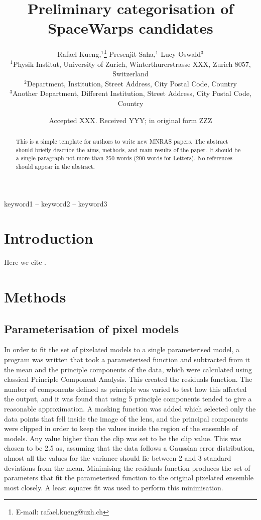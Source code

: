 \documentclass[fleqn,usenatbib]{mnras}
\title[Short title, max. 45 characters]{Preliminary categorisation of SpaceWarps candidates}
\author[R. Kueng et al.]{
Rafael Kueng,$^{1}$\thanks{E-mail: rafael.kueng@uzh.ch}
Presenjit Saha,$^{1}$
Lucy Oswald$^{3}$
\\
$^{1}$Physik Institut, University of Zurich, Winterthurerstrasse XXX, Zurich 8057, Switzerland\\
$^{2}$Department, Institution, Street Address, City Postal Code, Country\\
$^{3}$Another Department, Different Institution, Street Address, City Postal Code, Country
}
\date{Accepted XXX. Received YYY; in original form ZZZ}
\begin{document}
\label{firstpage}
\pagerange{\pageref{firstpage}--\pageref{lastpage}}
\maketitle

\begin{abstract}
This is a simple template for authors to write new MNRAS papers.
The abstract should briefly describe the aims, methods, and main results of the paper.
It should be a single paragraph not more than 250 words (200 words for Letters).
No references should appear in the abstract.
\end{abstract}

\begin{keywords}
keyword1 -- keyword2 -- keyword3
\end{keywords}


\section{Introduction}

Here we cite \cite{2015MNRAS.447.2170K}.

\section{Methods}

\subsection{Parameterisation of pixel models}
In order to fit the set of pixelated models to a single parameterised model, a program was written that took a parameterised function and subtracted from it the mean and the principle components of the data, which were calculated using classical Principle Component Analysis.
This created the residuals function.
The number of components defined as principle was varied to test how this affected the output, and it was found that using 5 principle components tended to give a reasonable approximation.
A masking function was added which selected only the data points that fell inside the image of the lens, and the principal components were clipped in order to keep the values inside the region of the ensemble of models.
Any value higher than the clip was set to be the clip value.
This was chosen to be 2.5 as, assuming that the data follows a Gaussian error distribution, almost all the values for the variance should lie between 2 and 3 standard deviations from the mean.
Minimising the residuals function produces the set of parameters that fit the parameterised function to the original pixelated ensemble most closely.
A least squares fit was used to perform this minimisation.
\end{document}
